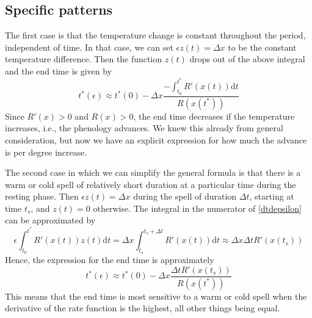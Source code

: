 \documentclass[12 pt]{article}
\begin{document}
\subsection*{Specific patterns}
The first case is that the temperature change is constant throughout the period, independent of time. In that case, we can set $\epsilon z(t)=\Delta x$ to be the constant temperature difference. Then the function $z(t)$ drops out of the above integral and the end time is given by
\begin{equation}
    t^*(\epsilon) \approx t^*(0) - \Delta x \frac{- \int _{t_0} ^{t^*} R'(x(t)) \mathrm{d}t}{R(x(t^*))} \tag{Eq. \theequation}
\end{equation}
Since $R'(x)>0$ and $R(x)>0$, the end time decreases if the temperature increases, i.e., the phenology advances. We knew this already from general consideration, but now we have an explicit expression for how much the advance is per degree increase. \par

The second case in which we can simplify the general formula is that there is a warm or cold spell of relatively short duration at a particular time during the resting phase. Then $\epsilon z(t)=\Delta x$ during the spell of duration $\Delta t$, starting at time $t_s$, and $z(t)=0$ otherwise. The integral in the numerator of \ref{dtdepsilon} can be approximated by
\begin{equation}
    \epsilon \int _{t_0} ^{t^*} R'(x(t)) z(t) \mathrm{d}t = \Delta x \int _{t_s} ^{t_s + \Delta t}R'(x(t)) \mathrm{d}t \approx \Delta x \Delta t R'(x(t_s)) \tag{Eq. \theequation}
\end{equation}
Hence, the expression for the end time is approximately
\begin{equation}
    t^*(\epsilon) \approx t^*(0)-\Delta x \frac{\Delta t R'(x(t_s))}{R(x(t^*))} \tag{Eq. \theequation}
\end{equation}
This means that the end time is most sensitive to a warm or cold spell when the derivative of the rate function is the highest, all other things being equal. \par
\end{document}
